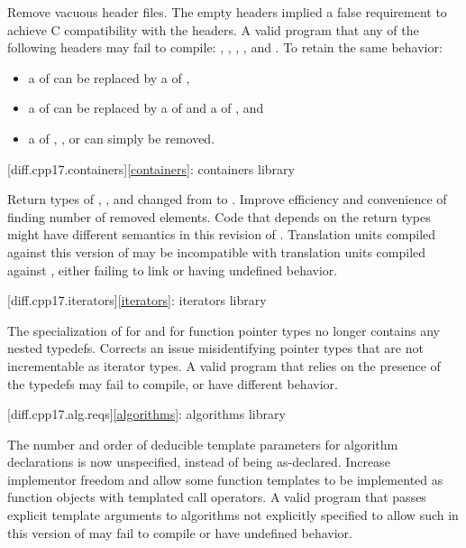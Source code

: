 \change
Remove vacuous \Cpp{} header files.
\rationale
The empty headers implied a false requirement to achieve C compatibility with the \Cpp{} headers.
\effect
A valid \CppXVII{} program that  any of the following headers may fail to compile:
,
,
,
, and
.
To retain the same behavior:
\begin{itemize}
\item
a  of  can be replaced by
a  of ,
\item
a  of  can be replaced by
a  of  and
a  of ,
and
\item
a  of
,
, or
can simply be removed.
\end{itemize}

[diff.cpp17.containers]{\ref*{containers}: containers library}

\change
Return types of , , and 
changed from  to .
\rationale
Improve efficiency and convenience of finding number of removed elements.
\effect
Code that depends on the return types might have different semantics in this revision of \Cpp{}.
Translation units compiled against this version of \Cpp{} may be incompatible with
translation units compiled against \CppXVII{}, either failing to link or having undefined behavior.

[diff.cpp17.iterators]{\ref*{iterators}: iterators library}

\change
The specialization of  for  and
for function pointer types no longer contains any nested typedefs.
\rationale
Corrects an issue misidentifying pointer types that are not incrementable
as iterator types.
\effect
A valid \CppXVII{} program that relies on the presence of the typedefs
may fail to compile, or have different behavior.

[diff.cpp17.alg.reqs]{\ref*{algorithms}: algorithms library}

\change
The number and order of deducible template parameters for algorithm declarations
is now unspecified, instead of being as-declared.
\rationale
Increase implementor freedom and allow some function templates
to be implemented as function objects with templated call operators.
\effect
A valid \CppXVII{} program that passes explicit template arguments to
algorithms not explicitly specified to allow such in this version of \Cpp{}
may fail to compile or have undefined behavior.

